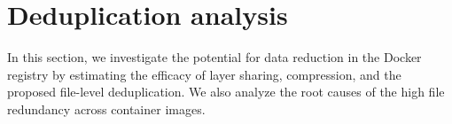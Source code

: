 \section{Deduplication analysis}
\label{sec:dedup-analysis}

In this section, we investigate the potential for data reduction in the
Docker registry by estimating the efficacy of layer sharing,
compression, and the proposed file-level deduplication.
%
We also analyze the root causes of the high file redundancy
across container images.
%
%
%
%
%
%
%
%




